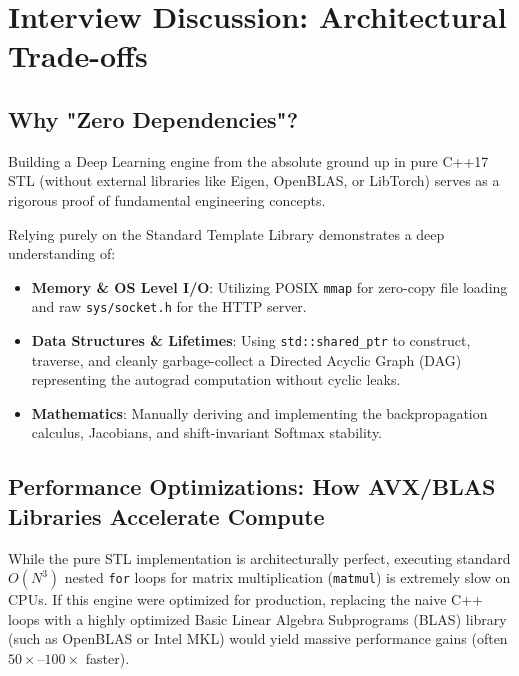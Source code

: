 \documentclass[12pt, a4paper]{article}
\begin{document}
\section{Interview Discussion: Architectural Trade-offs}

\subsection{Why "Zero Dependencies"?}
Building a Deep Learning engine from the absolute ground up in pure C++17 STL (without external libraries like Eigen, OpenBLAS, or LibTorch) serves as a rigorous proof of fundamental engineering concepts. 

Relying purely on the Standard Template Library demonstrates a deep understanding of:
\begin{itemize}
    \item \textbf{Memory \& OS Level I/O}: Utilizing POSIX \texttt{mmap} for zero-copy file loading and raw \texttt{sys/socket.h} for the HTTP server.
    \item \textbf{Data Structures \& Lifetimes}: Using \texttt{std::shared\_ptr} to construct, traverse, and cleanly garbage-collect a Directed Acyclic Graph (DAG) representing the autograd computation without cyclic leaks.
    \item \textbf{Mathematics}: Manually deriving and implementing the backpropagation calculus, Jacobians, and shift-invariant Softmax stability.
\end{itemize}

\subsection{Performance Optimizations: How AVX/BLAS Libraries Accelerate Compute}
While the pure STL implementation is architecturally perfect, executing standard $O(N^3)$ nested \texttt{for} loops for matrix multiplication (\texttt{matmul}) is extremely slow on CPUs. If this engine were optimized for production, replacing the naive C++ loops with a highly optimized Basic Linear Algebra Subprograms (BLAS) library (such as OpenBLAS or Intel MKL) would yield massive performance gains (often $50\times$--$100\times$ faster).
\end{document}
